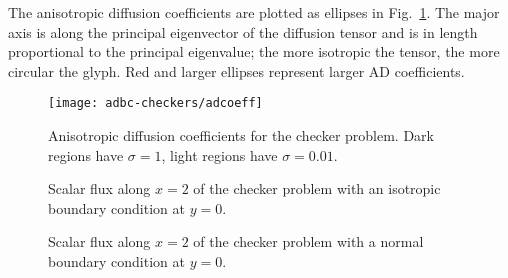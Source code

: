 The anisotropic diffusion coefficients are plotted as ellipses in
Fig.~\ref{fig:bcCheckersAdcoeff}. The major axis is along the principal
eigenvector of the diffusion tensor and is in length proportional to the
principal eigenvalue; the more isotropic the tensor, the more circular the
glyph. Red and larger ellipses represent larger AD coefficients.

\begin{figure}[htb]
  \centering\small
  \texttt{[image: adbc-checkers/adcoeff]}
  \caption[Anisotropic diffusion coefficients for the checker problem.]{
  Anisotropic diffusion coefficients for the checker problem. Dark
  regions have $\sigma=1$, light regions have $\sigma=0.01$.}
  \label{fig:bcCheckersAdcoeff}
\end{figure}

\begin{figure}[htb]
  \centering\small
  \hspace{-.5in}
  
  \hspace{-.5in}
  \caption{Scalar flux along $x=2$ of the checker problem with an isotropic
  boundary condition at $y=0$.}
  \label{fig:bcCheckersIsotropic}
\end{figure}

\begin{figure}[htb]
  \centering\small
  \hspace{-.5in}
  
  \hspace{-.5in}
  \caption{Scalar flux along $x=2$ of the checker problem with a normal
  boundary condition at $y=0$.}
  \label{fig:bcCheckersDelta}
\end{figure}



